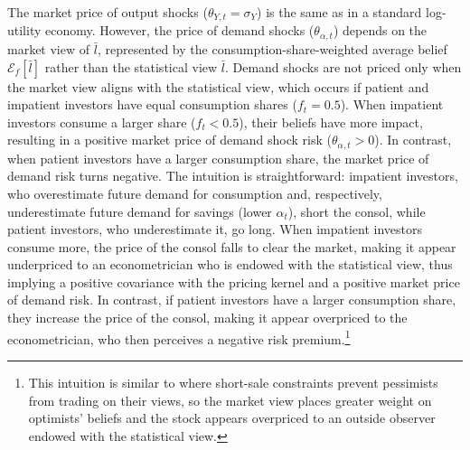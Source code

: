 \documentclass[preprint,11pt,authoryear]{elsarticle}
\theoremstyle{plain}
\begin{document}
The market price of output shocks (\(\theta_{Y,t} = \sigma_Y\)) is the same as in a standard log-utility economy. However, the price of demand shocks (\(\theta_{\alpha,t}\)) depends on the market view of \(\bar{l}\), represented by the consumption-share-weighted average belief \(\mathcal{E}_{f}\left[\bar{l}\right]\) rather than the statistical view \(\bar{l}\). Demand shocks are not priced only when the market view aligns with the statistical view, which occurs if patient and impatient investors have equal consumption shares (\(f_t = 0.5\)). When impatient investors consume a larger share (\(f_t < 0.5\)), their beliefs have more impact, resulting in a positive market price of demand shock risk (\(\theta_{\alpha,t} > 0\)). In contrast, when patient investors have a larger consumption share, the market price of demand risk turns negative. The intuition is straightforward: impatient investors, who overestimate future demand for consumption and, respectively, underestimate future demand for savings (lower \(\alpha_t\)), short the consol, while patient investors, who underestimate it, go long. When impatient investors consume more, the price of the consol falls to clear the market, making it appear underpriced to an econometrician who is endowed with the statistical view, thus implying a positive covariance with the pricing kernel and a positive market price of demand risk. In contrast, if patient investors have a larger consumption share, they increase the price of the consol, making it appear overpriced to the econometrician, who then perceives a negative risk premium.\footnote{This intuition is similar to \cite{MillerEdward1977} where short-sale constraints prevent pessimists from trading on their views, so the market view places greater weight on optimists’ beliefs and the stock appears overpriced to an outside observer endowed with the statistical view.}
\end{document}
